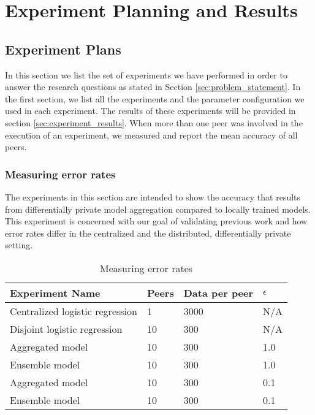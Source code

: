 
\chapter{Experiment Planning and Results}
\label{ch:experiments_and_results}

\section{Experiment Plans}
\label{sec:experiment_plan}

In this section we list the set of experiments we have performed in order to answer the research questions as stated in Section \ref{sec:problem_statement}. In the first section, we list all the experiments and the parameter configuration we used in each experiment. The results of these experiments will be provided in section \ref{sec:experiment_results}. When more than one peer was involved in the execution of an experiment, we measured and report the mean accuracy of all peers.


\subsection{Measuring error rates}
\label{sec:experiment_measuring_accuracy}
The experiments in this section are intended to show the accuracy that results from differentially private model aggregation compared to locally trained models. This experiment is concerned with our goal of validating previous work and how error rates differ in the centralized and the distributed, differentially private setting.

\begin{table}[h]
	\centering
	\begin{tabular}{|l|l|l|l|}
		{\bf Experiment Name}           & {\bf Peers} & {\bf Data per peer} & {\bf $\epsilon$} \\
		\hline
		Centralized logistic regression & 1           & 3000       & N/A              \\	
		Disjoint logistic regression    & 10          & 300        & N/A              \\
		Aggregated model                & 10          & 300        & 1.0              \\
		Ensemble model                  & 10          & 300        & 1.0              \\
		Aggregated model                & 10          & 300        & 0.1              \\
		Ensemble model  & 10    & 300        & 0.1             
	\end{tabular}
	\caption{Measuring error rates}
	\label{tab:experiment_accuracy_measuring}
\end{table}

